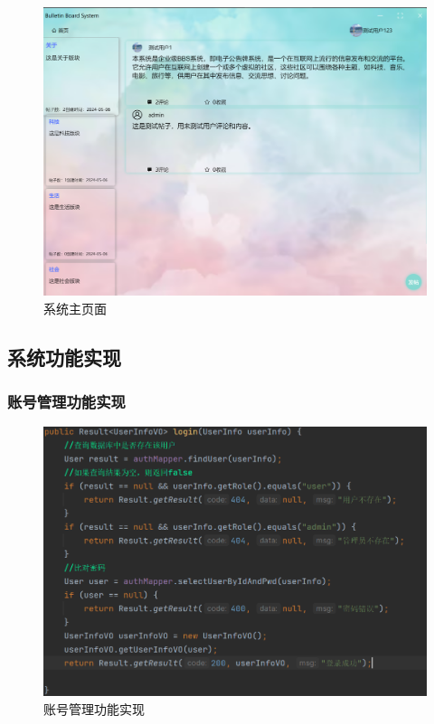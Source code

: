 \documentclass[UTF8]{ctexart}
\begin{document}
\begin{figure}[H]
  \centering
  \includegraphics[scale=0.3]{系统实现/用户帖子.png}
  \caption{系统主页面}
\end{figure}



\subsection{系统功能实现}

\subsubsection{账号管理功能实现}

\begin{figure}[H]
  \centering
  \includegraphics[scale=0.3]{系统实现/账户管理实现.png}
  \caption{账号管理功能实现}
\end{figure}
\end{document}
